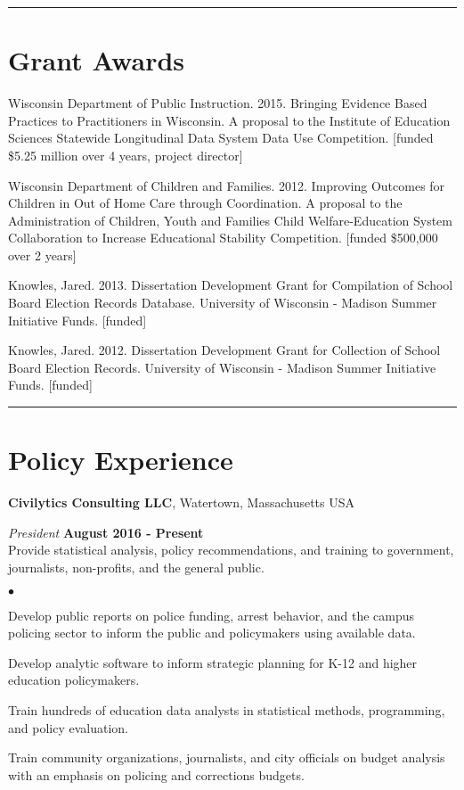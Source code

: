 \documentclass[margin,line]{res}
\newenvironment{list2}{
  \begin{list}{$\bullet$}{%
      \setlength{\itemsep}{0in}
      \setlength{\parsep}{0in} \setlength{\parskip}{0in}
      \setlength{\topsep}{0in} \setlength{\partopsep}{0in} 
      \setlength{\leftmargin}{0.2in}}}{\end{list}}
\begin{document}
\begin{resume}
\vspace*{1mm}
\noindent\hfil\rule{0.7\textwidth}{.4pt}\hfil
\vspace*{1mm}

\section{\sc Grant Awards}

Wisconsin Department of Public Instruction. 2015. Bringing Evidence Based 
Practices to Practitioners in Wisconsin. A proposal to the Institute of Education 
Sciences Statewide Longitudinal Data System Data Use Competition.  
[funded \$5.25 million over 4 years, project director]

Wisconsin Department of Children and Families. 2012. Improving Outcomes for Children in Out of Home Care through Coordination. A proposal to the Administration of Children, Youth and Families 
 Child Welfare-Education System Collaboration to Increase Educational Stability Competition. [funded \$500,000 over 2 years]

Knowles, Jared. 2013. Dissertation Development Grant for Compilation of School Board Election Records Database. University of Wisconsin - Madison Summer Initiative Funds. [funded]

Knowles, Jared. 2012. Dissertation Development Grant for Collection of School Board Election Records. University of Wisconsin - Madison Summer Initiative Funds. [funded]

\vspace*{1mm}
\noindent\hfil\rule{0.7\textwidth}{.4pt}\hfil
\vspace*{1mm}


\section{\sc Policy Experience}
{\bf Civilytics Consulting LLC}, Watertown, Massachusetts USA


{\em President} \hfill {\bf August 2016 - Present}\\
Provide statistical analysis, policy recommendations, and training to government, 
journalists, non-profits, and the general public. 
\begin{list2}
\item Develop public reports on police funding, arrest behavior, and the campus 
policing sector to inform the public and policymakers using available data.
\item Develop analytic software to inform strategic planning for K-12 and higher 
education policymakers. 
\item Train hundreds of education data analysts in statistical methods, programming, 
and policy evaluation.
\item Train community organizations, journalists, and city officials on budget 
analysis with an emphasis on policing and corrections budgets. 
\end{list2}


\end{resume}
\end{document}
